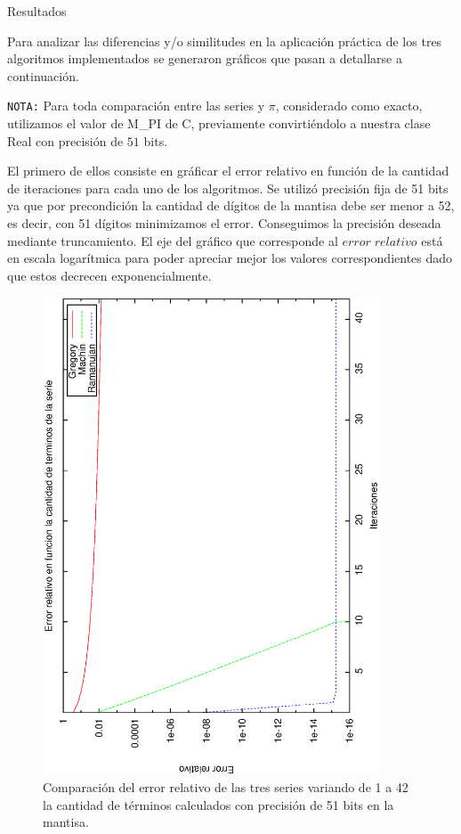 \begin{section}{Resultados}

	Para analizar las diferencias y/o similitudes en la aplicación práctica de los tres algoritmos implementados se generaron gráficos que pasan a detallarse a continuación. 
		
	\texttt{NOTA:} Para toda comparación entre las series y $\pi$, considerado como exacto, utilizamos el valor de M\_PI de C, previamente convirtiéndolo a nuestra clase Real con precisión de $51$ bits. 
		
	El primero de ellos consiste en gráficar el error relativo en función de la cantidad de iteraciones para cada uno de los algoritmos. Se utilizó precisión fija de 51 bits ya que por precondición la cantidad de dígitos de la mantisa debe ser menor a 52, es decir, con 51 dígitos minimizamos el error. Conseguimos la precisión deseada mediante truncamiento.
	El eje del gráfico que corresponde al $error\;relativo$ está en escala logarítmica para poder apreciar mejor los valores correspondientes dado que estos decrecen exponencialmente.

	\begin{figure}[H]
	  \centering
		\includegraphics[width=10cm,angle=-90]{graficos/comparacion_1a42it_51p.eps}
	  \caption{Comparación del error relativo de las tres series variando de 1 a 42 la cantidad de términos calculados con precisión de 51 bits en la mantisa.}
	  \label{fig:51p}
	\end{figure}
	

\end{section}
